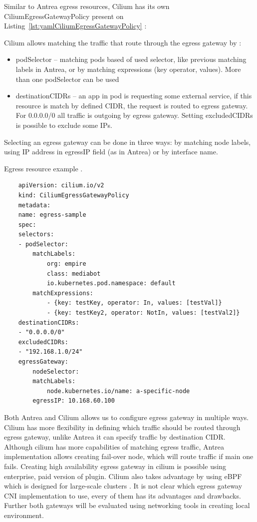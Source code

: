 Similar to Antrea egress resources, Cilium has its own CiliumEgressGatewayPolicy present on Listing~\ref{lst:yamlCiliumEgressGatewayPolicy} \cite{CiliumEgressGateway}:

Cilium allows matching the traffic that route through the egress gateway by \cite{CiliumEgressGateway}:
\begin{itemize}
    \item podSelector -- matching pods based of used selector, like previous matching labels in Antrea, or by matching expressions (key operator, values). More than one podSelector can be used
    \item destinationCIDRs -- an app in pod is requesting some external service, if this resource is match by defined CIDR, the request is routed to egress gateway. For 0.0.0.0/0 all traffic is outgoing by egress gateway. Setting excludedCIDRs is possible to exclude some IPs.
\end{itemize}

Selecting an egress gateway can be done in three ways: by matching node labels, using IP address in egressIP field (as in Antrea) or by interface name. 

\begin{listing}[htb]
    \centering
    \caption{Egress resource example \cite{AntreaEgressArch}.}
    \begin{verbatim}
    apiVersion: cilium.io/v2
    kind: CiliumEgressGatewayPolicy
    metadata:
    name: egress-sample
    spec:
    selectors:
    - podSelector:
        matchLabels:
            org: empire
            class: mediabot
            io.kubernetes.pod.namespace: default
        matchExpressions:
            - {key: testKey, operator: In, values: [testVal]}
            - {key: testKey2, operator: NotIn, values: [testVal2]}
    destinationCIDRs:
    - "0.0.0.0/0"
    excludedCIDRs:
    - "192.168.1.0/24"
    egressGateway:
        nodeSelector:
        matchLabels:
            node.kubernetes.io/name: a-specific-node
        egressIP: 10.168.60.100
    \end{verbatim}
    \label{lst:yamlCiliumEgressGatewayPolicy}
\end{listing}


Both Antrea and Cilium allows us to configure egress gateway in multiple ways. Cilium has more flexibility in defining which traffic should be routed through egress gateway, unlike Antrea it can specify traffic by destination CIDR. Although cilium has more capabilities of matching egress traffic, Antrea implementation allows creating fail-over node, which will route traffic if main one fails. Creating high availability egress gateway in cilium is possible using enterprise, paid version of plugin. Cilium also takes advantage by using eBPF which is designed for large-scale clusters \cite{CiliumOverview}. It is not clear which egress gateway CNI implementation to use, every of them has its advantages and drawbacks. Further both gateways will be evaluated using networking tools in creating local environment.




